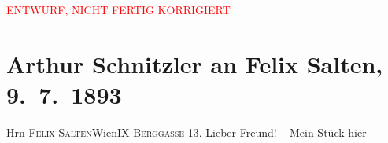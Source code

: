 
\begin{center}
            \textcolor{red}{ENTWURF, NICHT FERTIG KORRIGIERT}
                      \end{center}
            
         
         \newcommand{\erwaehntePersonen}{Personen: Franz von Aichelburg-Labia, Richard Beer-Hofmann, Johannes Brahms, Bertha Flegmann, Marie Glümer, Marie Griebl, Emil Höfer, Josef Jarno, Felix Salten, Grethe Wreden}
         \newcommand{\erwaehnteInstitutionen}{Institutionen: Volkstheater}
         \newcommand{\erwaehnteOrte}{Orte: Berggasse, Gmunden, Wien}
         \newcommand{\erwaehnteWerke}{Werke: Abschiedssouper, Die Frage an das Schicksal}
               \section[Arthur Schnitzler an Felix Salten, 9. 7. 1893]{ Arthur Schnitzler an Felix Salten, 9. 7. 1893}\nopagebreak{}\rehead{ }\begin{ledgroupsized}[t]{13cm}\normalsize\beginnumbering \toendnotes[C]{\smallbreak\pagebreak[2]} 
\toendnotes[C]{\smallbreak}\pstart{}{\pb}Hrn \textsc{Felix
                     Salten}\pend{}\pstart{}Wien\pend{}\pstart{}\textsc{IX Berggasse 13}.\pend{}{\bigskip}\pstart
           \noindent{}{\pb}Lieber Freund! – Mein Stück hier

\end{ledgroupsized}
